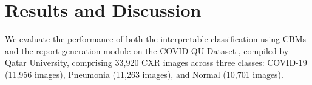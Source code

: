 \documentclass[runningheads]{llncs}
\begin{document}
\section{Results and Discussion}
We evaluate the performance of both the interpretable classification using CBMs and the report generation module on the COVID-QU Dataset \cite{chowdhury2020can}, compiled by Qatar University, comprising 33,920 CXR images across three classes: COVID-19 (11,956 images), Pneumonia (11,263 images), and Normal (10,701 images). 


\begin{table}[b]
    \centering
    \label{tab:side_by_side}
    \begin{minipage}{0.45\textwidth}
        \centering
        \caption{Classification Performance Comparision.} 
        \label{tab:comp}
    \end{minipage}%
    \hfill
    \begin{minipage}{0.45\textwidth}
        \centering
        \caption{Clustering Evaluation for Report Generation Approaches}
        \label{tab:cluster}
    \end{minipage}
\end{table}
\end{document}
